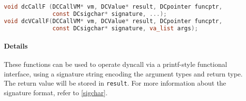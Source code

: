 \begin{lstlisting}[language=c]
void dcCallF (DCCallVM* vm, DCValue* result, DCpointer funcptr, 
              const DCsigchar* signature, ...);
void dcVCallF(DCCallVM* vm, DCValue* result, DCpointer funcptr, 
              const DCsigchar* signature, va_list args);
\end{lstlisting}

\paragraph{Details}

These functions can be used to operate dyncall via a printf-style functional 
interface, using a signature string encoding the argument types and 
return type. The return value will be stored in \lstinline{result}.
For more information about the signature format, refer to \ref{sigchar}.

